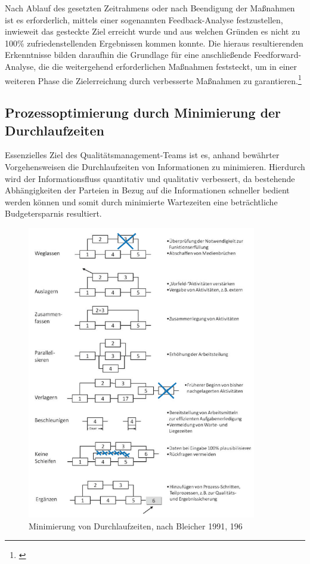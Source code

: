 Nach Ablauf des gesetzten Zeitrahmens oder nach Beendigung der Maßnahmen ist es erforderlich, mittels einer sogenannten Feedback-Analyse festzustellen, inwieweit das gesteckte Ziel erreicht wurde und aus welchen Gründen es nicht zu 100\% zufriedenstellenden Ergebnissen kommen konnte. 
Die hieraus resultierenden Erkenntnisse bilden daraufhin die Grundlage für eine anschließende Feedforward-Analyse, die die weitergehend erforderlichen Maßnahmen feststeckt, um in einer weiteren Phase die Zielerreichung durch verbesserte Maßnahmen zu garantieren.\footnote{\cite{gadatsch_it-controlling_2012}}

\subsection{Prozessoptimierung durch Minimierung der Durchlaufzeiten}
Essenzielles Ziel des Qualitätsmanagement-Teams ist es, anhand bewährter Vorgehensweisen die Durchlaufzeiten von Informationen zu minimieren. 
Hierdurch wird der Informationsfluss quantitativ und qualitativ verbessert, da bestehende Abhängigkeiten der Parteien in Bezug auf die Informationen schneller bedient werden können und somit durch minimierte Wartezeiten eine beträchtliche Budgetersparnis resultiert.

\begin{figure}[h!]
	\centering
	\includegraphics[width=10cm]{kapitel/gruppe1_1/bilder/minimierung_durchlaufzeiten}
	\caption{Minimierung von Durchlaufzeiten, nach Bleicher 1991, 196}
	\label{fig_minimierung_durchlaufzeiten}
\end{figure}

